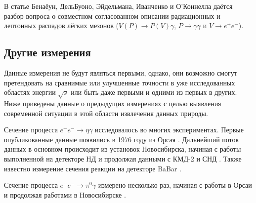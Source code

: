В статье Бенаёун, ДельБуоно, Эйдельмана, Иванченко и О'Коннелла \cite{Benayoun:1999fv} даётся разбор
вопроса о совместном согласованном описании радиационных и лептонных
распадов лёгких мезонов ($V(P) \to P(V)\gamma$, $P \to \gamma \gamma$ и
$V \to e^+ e^-$).


\subsection{Другие измерения}\label{other-measurments}

Данные измерения не будут являться первыми, однако, они возможно смогут
претендовать на сравнимые или улучшенные точности в уже исследованных
областях энергии $\sqrt{s}$ или быть даже первыми и одними из первых в
других. Ниже приведены данные о предыдущих измерениях с целью выявления
современной ситуации в этой области извлечения данных природы.

Сечение процесса $e^+e^-\to\eta\gamma$ исследовалось во многих экспериментах.
Первые опубликованные данные появились в 1976 году из Орсая \cite{Cosme:1975rs}.
Дальнейший поток данных в основном происходит из установок Новосибирска, начиная с работы выполненной на детекторе НД \cite{Druzhinin:1984zq} и продолжая данными с КМД-2 \cite{Akhmetshin:1995vz, Akhmetshin:1999zv, Akhmetshin:2001hm, Akhmetshin:2004gw} и СНД \cite{Achasov:1997nq, Achasov:2000zd, Achasov:2006dv, Achasov:2013eli}.
Также известно измерение сечения реакции на детекторе BaBar \cite{Aubert:2006cy}.

Сечение процесса $e^+e^-\to\pi^0\gamma$ измерено несколько раз, начиная с работы в Орсаи \cite{Cosme:1975rs} и продолжая работами в Новосибирске \cite{Druzhinin:1984zq, Achasov:2000zd, Achasov:2003ed, Akhmetshin:2004gw, Achasov:2016bfr}.
